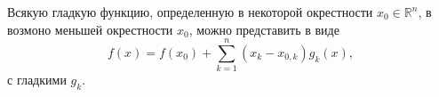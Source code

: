 


\begin{to_lem} 
    Всякую гладкую функцию, определенную в некоторой окрестности $x_0 \in \mathbb{R}^n$, в возмоно меньшей окрестности $x_0$, можно представить в виде
    \begin{equation*}
         f(x) = f(x_0) + \sum_{k=1}^n (x_k  - x_{0, k}) g_k (x), 
     \end{equation*} 
     с гладкими $g_k$.
\end{to_lem}